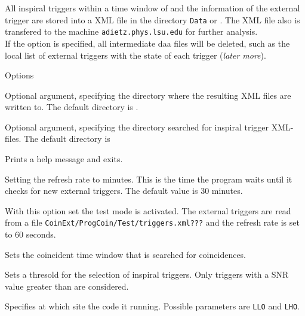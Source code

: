 \begin{entry}
All inspiral triggers within a time window of  and the information of the external trigger are stored into a XML file in the directory {\tt Data} or . The XML file also is transfered to the machine {\tt adietz.phys.lsu.edu} for further analysis.\\

If the option  is specified, all intermediate daa files will be deleted, such as the local list of external triggers with the state of each trigger ({\it later more}).

\item[Options]\leavevmode
\begin{entry}

 
\item[\option{--dirData} \parm{dir\_data}]
Optional argument, specifying the directory where the resulting XML files are written to. The default directory is .

\item[\option{--dirInspiral} \parm{dir\_insp}]
Optional argument, specifying the directory searched for inspiral trigger XML-files. The default directory is 

\item[\option{--help}]
Prints a help message and exits.

\item[\option{--refresh} \parm{t\_refresh}]
Setting the refresh rate to  minutes. This is the time the program waits until it checks for new external triggers. The default value is 30 minutes.

\item[\option{--test}]
With this option set the test mode is activated. The external triggers are read from a file {\tt CoinExt/ProgCoin/Test/triggers.xml???} and the refresh rate is set to 60 seconds.

\item[\option{--timeWindow} \parm{t\_window}]
Sets the coincident time window that is searched for coincidences.

\item[\option{--snrCut} \parm{cut}]
Sets a thresold for the selection of inspiral triggers. Only triggers with a SNR value greater than  are considered.

\item[\option{--ifo} \parm{ifo\_name}]
Specifies at which site the code it running. Possible parameters are {\tt LLO} and {\tt LHO}.


\end{entry}
\end{entry}

